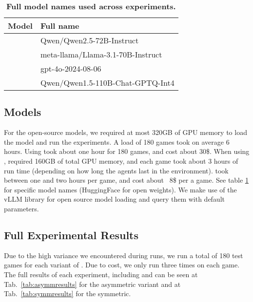 \begin{table}[t]
\centering
\setlength\tabcolsep{4pt}
\footnotesize
  \begin{tabular}{lp{4.5cm}}
    \toprule
    \textbf{Model} & \textbf{Full name} \\
    \midrule
    \textsc{\qwen{}} & Qwen/Qwen2.5-72B-Instruct \\
    \textsc{\llama{}} & meta-llama/Llama-3.1-70B-Instruct \\
    \textsc{\gpt{}} & gpt-4o-2024-08-06 \\
    \textsc{\qwenlarge{}} & Qwen/Qwen1.5-110B-Chat-GPTQ-Int4 \\
    \bottomrule
  \end{tabular}
  \caption{\textbf{Full model names used across experiments.}}
  \label{tab:models_used}
\end{table}



\subsection{Models}
\label{app:models}
For the open-source models, we required at most 320GB of GPU memory to load the model and run the experiments. A load of 180 games took on average 6 hours. Using \gpt{} took about one hour for 180 games, and cost about 30\$.
When using \govsim{}, \qwenlarge{} required 160GB of total GPU memory, and each game took about 3 hours of run time (depending on how long the agents last in the environment). \gpt{} took between one and two hours per game, and cost about ~8\$ per a game. See table \ref{tab:models_used} for specific model names (HuggingFace for open weights). We make use of the vLLM library for open source model loading \cite{kwon2023efficient} and query them with default parameters. 


\subsection{Full Experimental Results}
\label{app:fullwhodunit}
Due to the high variance we encountered during runs, we run a total of 180 test games for each variant of \ourenv{}. Due to cost, we only run \gpt{} three times on each game. The full results of each experiment, including \success{} and \precision{} can be seen at Tab.~\ref{tab:asymmresults} for the asymmetric variant and at Tab.~\ref{tab:symmresults} for the symmetric. 

